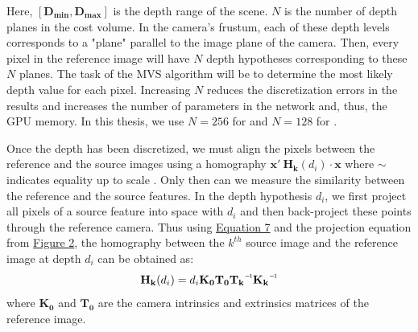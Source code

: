 Here, $[\mathbf{D_{min}}, \mathbf{D_{max}}]$ is the depth range of the scene. $N$ is the number of depth planes in the cost volume. In the camera's frustum, each of these depth levels corresponds to a "plane" parallel to the image plane of the camera. Then, every pixel in the reference image will have $N$ depth hypotheses corresponding to these $N$ planes. The task of the MVS algorithm will be to determine the most likely depth value for each pixel. Increasing $N$ reduces the discretization errors in the results and increases the number of parameters in the network and, thus, the GPU memory. In this thesis, we use $N=256$ for {\rmvd} and $N=128$ for {\mvsn}.

Once the depth has been discretized, we must align the pixels between the reference and the source images using a homography $\mathbf{x'} ~ \mathbf{H_k}(d_i)\cdot \mathbf{x}$ where $∼$ indicates equality up to scale \cite{Szeliski2010book, Yao2018}.  Only then can we measure the similarity between the reference and the source features. In the depth hypothesis $d_i$, we first project all pixels of a source feature into space with $d_i$ and then back-project these points through the reference camera. Thus using \hyperref[eq:world-to-pix]{Equation 7} and the projection equation from \hyperref[fig:psw]{Figure 2}, the homography between the $k^{th}$ source image and the reference image at depth $d_i$ can be obtained as:
\begin{equation}
    \mathbf{H_k}(d_i)= d_i\mathbf{K_0T_0\inv{T_k}\inv{K_k}}
\end{equation}\label{eq:homography}
where $\mathbf{K_0}$ and $\mathbf{T_0}$ are the camera intrinsics and extrinsics matrices of the reference image. \cite{zhu2021deep}

